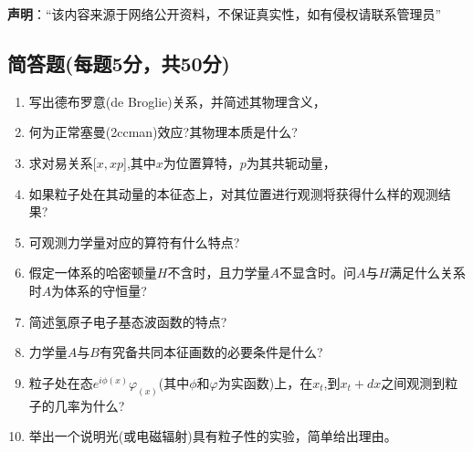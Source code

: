 
\textbf{声明}：“该内容来源于网络公开资料，不保证真实性，如有侵权请联系管理员”

\subsection{简答题(每题5分，共50分)}
\begin{enumerate}
\item 写出德布罗意(de Broglie)关系，并简述其物理含义，
\item 何为正常塞曼(2ccman)效应?其物理本质是什么?
\item 求对易关系[$x,xp$],其中$x$为位置算特，$p$为其共轭动量，
\item 如果粒子处在其动量的本征态上，对其位置进行观测将获得什么样的观测结果?
\item 可观测力学量对应的算符有什么特点?
\item 假定一体系的哈密顿量$H$不含时，且力学量$A$不显含时。问$A$与$H$满足什么关系时$A$为体系的守恒量?
\item 简述氢原子电子基态波函数的特点?
\item 力学量$A$与$B$有究备共同本征画数的必要条件是什么?
\item 粒子处在态$e^{i\phi(x)}\varphi_(x)$(其中$\phi$和$\varphi$为实函数)上，在$x_t$,到$x_t+dx$之间观测到粒子的几率为什么?
\item 举出一个说明光(或电磁辐射)具有粒子性的实验，简单给出理由。
\end{enumerate}
